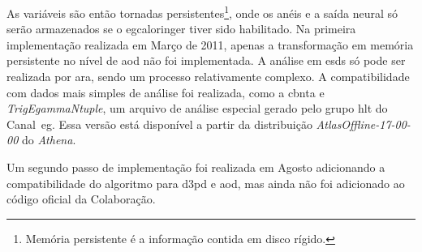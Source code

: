 As variáveis são então tornadas persistentes\footnote{Memória persistente é a informação
contida em disco rígido.}, onde os anéis e a saída neural só serão armazenados
se o \gls{egcaloringer} tiver sido habilitado. Na primeira implementação
realizada em Março de 2011, apenas a transformação em memória persistente 
no nível de \gls{aod} não foi implementada. A análise em \glspl{esd} 
só pode ser realizada por \gls{ara},
sendo um processo relativamente complexo.
A compatibilidade com dados mais simples de análise foi realizada, como a
\gls{cbnta} e \emph{TrigEgammaNtuple}, um arquivo de análise especial gerado
pelo grupo \gls{hlt} do Canal~\gls{eg}. Essa versão está disponível a partir da
distribuição \emph{AtlasOffline-17-00-00} do \emph{Athena}.

Um segundo passo de implementação foi realizada em Agosto adicionando a
compatibilidade do algoritmo para \gls{d3pd} e \gls{aod}, mas ainda não foi
adicionado ao código oficial da Colaboração.



